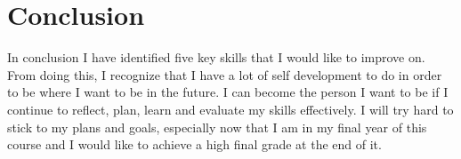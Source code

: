 \documentclass{scrartcl}
\begin{document}
\section*{Conclusion}
In conclusion I have identified five key skills that I would like to improve on. From doing this, I recognize that I have a lot of self development to do in order to be where I want to be in the future. I can become the person I want to be if I continue to reflect, plan, learn and evaluate my skills effectively. I will try hard to stick to my plans and goals, especially now that I am in my final year of this course and I would like to achieve a high final grade at the end of it. 



\end{document}
